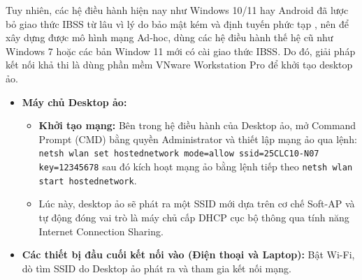 Tuy nhiên, các hệ điều hành hiện nay như Windows 10/11 hay Android đã lược bỏ giao thức IBSS từ lâu vì lý do bảo mật kém và định tuyến phức tạp \cite{ms_ibss_2021}, nên để xây dựng được mô hình mạng Ad-hoc, dùng các hệ điều hành thế hệ cũ như Windows 7 hoặc các bản Window 11 mới có cài giao thức IBSS. Do đó, giải pháp kết nối khả thi là dùng phần mềm VNware Workstation Pro để khởi tạo desktop ảo.
\begin{itemize}
    \item \textbf{Máy chủ Desktop ảo:}
    \begin{itemize}
        \item \textbf{Khởi tạo mạng:} Bên trong hệ điều hành của Desktop ảo, mở Command Prompt (CMD) bằng quyền Administrator và thiết lập mạng ảo qua lệnh:
        \texttt{netsh wlan set hostednetwork mode=allow ssid=25CLC10-N07 key=12345678} 
        sau đó kích hoạt mạng ảo bằng lệnh tiếp theo \texttt{netsh wlan start hostednetwork}.
        \item Lúc này, desktop ảo sẽ phát ra một SSID mới dựa trên cơ chế Soft-AP và tự động đóng vai trò là máy chủ cấp DHCP cục bộ thông qua tính năng Internet Connection Sharing.
    \end{itemize}
    \item \textbf{Các thiết bị đầu cuối kết nối vào (Điện thoại và Laptop):}
    Bật Wi-Fi, dò tìm SSID do Desktop ảo phát ra và tham gia kết nối mạng.
\end{itemize}